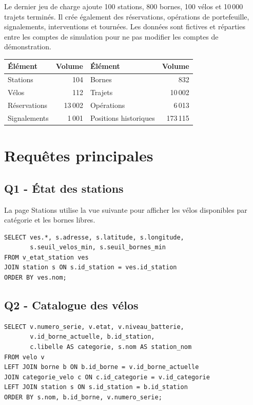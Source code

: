 \documentclass[11pt,a4paper]{article}
\begin{document}
Le dernier jeu de charge ajoute 100 stations, 800 bornes, 100 vélos et 10\,000 trajets terminés. Il crée également des réservations, opérations de portefeuille, signalements, interventions et tournées. Les données sont fictives et réparties entre les comptes de simulation pour ne pas modifier les comptes de démonstration.

\begin{center}
\begin{tabular}{lrlr}
\toprule
\textbf{Élément} & \textbf{Volume} & \textbf{Élément} & \textbf{Volume}\\
\midrule
Stations & 104 & Bornes & 832\\
Vélos & 112 & Trajets & 10\,002\\
Réservations & 13\,002 & Opérations & 6\,013\\
Signalements & 1\,001 & Positions historiques & 173\,115\\
\bottomrule
\end{tabular}
\end{center}

\section{Requêtes principales}
\subsection{Q1 - État des stations}
La page Stations utilise la vue suivante pour afficher les vélos disponibles par catégorie et les bornes libres.
\begin{verbatim}
SELECT ves.*, s.adresse, s.latitude, s.longitude,
       s.seuil_velos_min, s.seuil_bornes_min
FROM v_etat_station ves
JOIN station s ON s.id_station = ves.id_station
ORDER BY ves.nom;
\end{verbatim}

\subsection{Q2 - Catalogue des vélos}
\begin{verbatim}
SELECT v.numero_serie, v.etat, v.niveau_batterie,
       v.id_borne_actuelle, b.id_station,
       c.libelle AS categorie, s.nom AS station_nom
FROM velo v
LEFT JOIN borne b ON b.id_borne = v.id_borne_actuelle
JOIN categorie_velo c ON c.id_categorie = v.id_categorie
LEFT JOIN station s ON s.id_station = b.id_station
ORDER BY s.nom, b.id_borne, v.numero_serie;
\end{verbatim}
\end{document}
